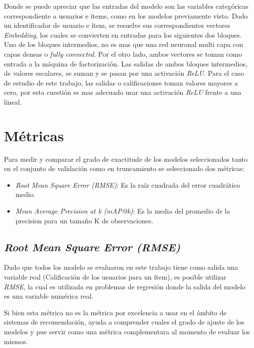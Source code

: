 \documentclass[11pt,a4paper,twoside]{thesis}
\begin{document}
Donde se puede apreciar que las entradas del modelo son las variables
categóricas correspondiente a usuarios e ítems, como en los modelos previamente
visto. Dado un identificador de usuario e ítem, se resuelve sus
correspondientes vectores \textit{Embedding}, los cuales se convierten en
entradas para los siguientes dos bloques. Uno de los bloques intermedios, no es
mas que una red neuronal multi capa con capas densas o \textit{fully
	connected}. Por el otro lado, ambos vectores se toman como entrada a la máquina
de factorización. Las salidas de ambos bloques intermedios, de valores
escalares, se suman y se pasan por una activación \textit{ReLU}. Para el caso
de estudio de este trabajo, las salidas o calificaciones toman valores mayores
a cero, por esta cuestión es mas adecuado usar una activación \textit{ReLU}
frente a una lineal.

\section{Métricas}

Para medir y comparar el grado de exactitude de los modelos seleccionados tanto
en el conjunto de validación como en truncamiento se seleccionado dos métricas:

\begin{itemize}
	\item \textit{Root Mean Square Error (RMSE)}: Es la raíz cuadrada del error
	      cuadrático medio.
	\item \textit{Mean Average Precision at k (mAP@k)}: Es la media del
	      promedio de la precision  para un tamaño K de observaciones.
\end{itemize}

\subsection{\textit{Root Mean Square Error (RMSE)}}

Dado que todos los modelo se evaluaron en este trabajo tiene como salida una
variable real (Calificación de los usuarios para un ítem), es posible utilizar
\textit{RMSE}, la cual es utilizada en problemas de regresión donde la salida
del modelo es una variable numérica real.

Si bien esta métrica no es la métrica por excelencia a usar en el ámbito de
sistemas de recomendación, ayuda a comprender cuales el grado de ajuste de los
modelos y pue servir como una métrica complementara al momento de evaluar los
mismos.
\end{document}
